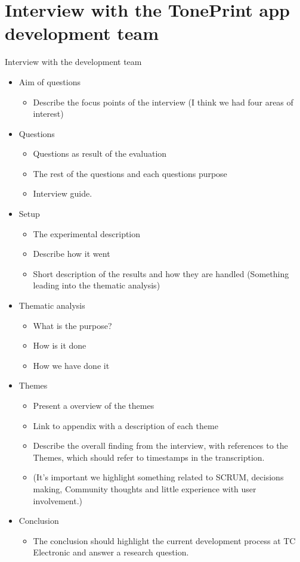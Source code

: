 \chapter{Interview with the TonePrint app development team}
\label{Interview}
\begin{LARGE}
Interview with the development team
\end{LARGE}

\begin{itemize}
	\item Aim of questions
		\begin{itemize}
			\item Describe the focus points of the interview (I think we had four areas of interest)
		\end{itemize}
	\item Questions
		\begin{itemize}
			\item Questions as result of the evaluation
			\item The rest of the questions and each questions purpose
			\item Interview guide.
		\end{itemize}
	\item Setup
		\begin{itemize}
			\item The experimental description
			\item Describe how it went
			\item Short description of the results and how they are handled (Something leading into the thematic analysis)
		\end{itemize}
	\item Thematic analysis
		\begin{itemize}
			\item What is the purpose?
			\item How is it done
			\item How we have done it
		\end{itemize}
	\item Themes
		\begin{itemize}
			\item Present a overview of the themes
			\item Link to appendix with a description of each theme
			\item Describe the overall finding from the interview, with references to the Themes, which should refer to timestamps in the transcription.
			\item (It’s important we highlight something related to SCRUM, decisions making, Community thoughts and little experience with user involvement.)
		\end{itemize}
	\item Conclusion
		\begin{itemize}
			\item The conclusion should highlight the current development process at TC Electronic and answer a research question.
		\end{itemize}
\end{itemize}
